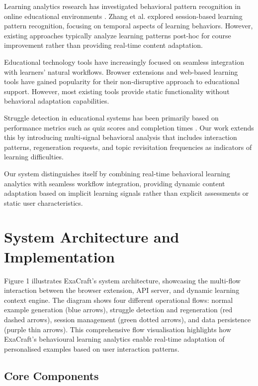 \documentclass[sigconf]{acmart}
\begin{document}
Learning analytics research has investigated behavioral pattern recognition in online educational environments \cite{yagci2022educational}. Zhang et al. \cite{saqr2023temporal} explored session-based learning pattern recognition, focusing on temporal aspects of learning behaviors. However, existing approaches typically analyze learning patterns post-hoc for course improvement rather than providing real-time content adaptation.

Educational technology tools have increasingly focused on seamless integration with learners' natural workflows. Browser extensions and web-based learning tools have gained popularity for their non-disruptive approach to educational support. However, most existing tools provide static functionality without behavioral adaptation capabilities.

Struggle detection in educational systems has been primarily based on performance metrics such as quiz scores and completion times \cite{baker2019educational}. Our work extends this by introducing multi-signal behavioral analysis that includes interaction patterns, regeneration requests, and topic revisitation frequencies as indicators of learning difficulties.

Our system distinguishes itself by combining real-time behavioral learning analytics with seamless workflow integration, providing dynamic content adaptation based on implicit learning signals rather than explicit assessments or static user characteristics.

\section{System Architecture and Implementation}

Figure 1 illustrates ExaCraft's system architecture, showcasing the multi-flow interaction between the browser extension, API server, and dynamic learning context engine. The diagram shows four different operational flows: normal example generation (blue arrows), struggle detection and regeneration (red dashed arrows), session management (green dotted arrows), and data persistence (purple thin arrows). This comprehensive flow visualisation highlights how ExaCraft's behavioural learning analytics enable real-time adaptation of personalised examples based on user interaction patterns.

\subsection{Core Components}
\end{document}
